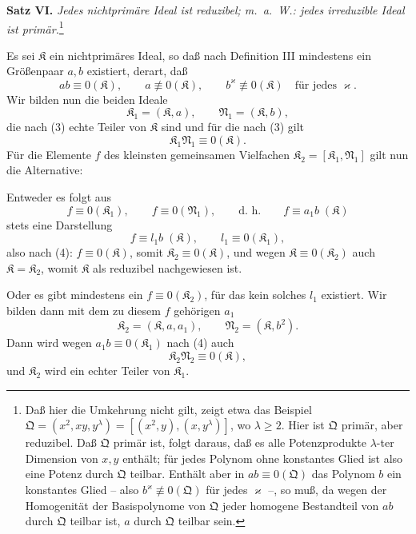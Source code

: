 \documentclass[11pt]{article}
\newcommand{\ideal}[1]{\mathfrak{#1}}
\begin{document}
\textbf{Satz VI.} \emph{Jedes nichtprimäre Ideal ist reduzibel; m.~a.~W.: jedes irreduzible Ideal ist primär.}\footnote{Daß hier die Umkehrung nicht gilt, zeigt etwa das Beispiel $\ideal Q=(x^2,xy,y^\lambda)=[(x^2,y),(x,y^\lambda)]$, wo $\lambda\ge2$. Hier ist $\ideal Q$ primär, aber reduzibel. Daß $\ideal Q$ primär ist, folgt daraus, daß es alle Potenzprodukte $\lambda$-ter Dimension von $x,y$ enthält; für jedes Polynom ohne konstantes Glied ist also eine Potenz durch $\ideal Q$ teilbar. Enthält aber in $ab\equiv0(\ideal Q)$ das Polynom $b$ ein konstantes Glied -- also $b^\varkappa\not\equiv0(\ideal Q)$ für jedes $\varkappa$ --, so muß, da wegen der Homogenität der Basispolynome von $\ideal Q$ jeder homogene Bestandteil von $ab$ durch $\ideal Q$ teilbar ist, $a$ durch $\ideal Q$ teilbar sein.}

Es sei $\ideal K$ ein nichtprimäres Ideal, so daß nach Definition III mindestens ein Größenpaar $a,b$ existiert, derart, daß
\begin{equation}
 a b\equiv0(\ideal K),\qquad
 a\not\equiv0(\ideal K),\qquad
 b^\varkappa\not\equiv0(\ideal K)\quad\text{für jedes }\varkappa.
\tag{3}
\end{equation}
Wir bilden nun die beiden Ideale
\[
 \ideal K_1=(\ideal K,a),\qquad \ideal N_1=(\ideal K,b),
\]
die nach (3) echte Teiler von $\ideal K$ sind und für die nach (3) gilt
\begin{equation}
 \ideal K_1\ideal N_1\equiv0(\ideal K).
\tag{4}
\end{equation}
Für die Elemente $f$ des kleinsten gemeinsamen Vielfachen $\ideal K_2=[\ideal K_1,\ideal N_1]$ gilt nun die Alternative:

Entweder es folgt aus
\[
 f\equiv0(\ideal K_1),\qquad f\equiv0(\ideal N_1),
 \qquad\text{d.~h.}\qquad f\equiv a_1 b\;(\ideal K)
\]
stets eine Darstellung
\[
 f\equiv l_1 b\;(\ideal K),\qquad l_1\equiv0(\ideal K_1),
\]
also nach (4): $f\equiv0(\ideal K)$, somit $\ideal K_2\equiv0(\ideal K)$, und wegen $\ideal K\equiv0(\ideal K_2)$ auch $\ideal K=\ideal K_2$, womit $\ideal K$ als reduzibel nachgewiesen ist.

Oder es gibt mindestens ein $f\equiv0(\ideal K_2)$, für das kein solches $l_1$ existiert. Wir bilden dann mit dem zu diesem $f$ gehörigen $a_1$
\[
 \ideal K_2=(\ideal K,a,a_1),\qquad \ideal N_2=(\ideal K,b^2).
\]
Dann wird wegen $a_1b\equiv0(\ideal K_1)$ nach (4) auch
\begin{equation}
 \ideal K_2\ideal N_2\equiv0(\ideal K),
\tag{4'}
\end{equation}
und $\ideal K_2$ wird ein echter Teiler von $\ideal K_1$.
\end{document}
